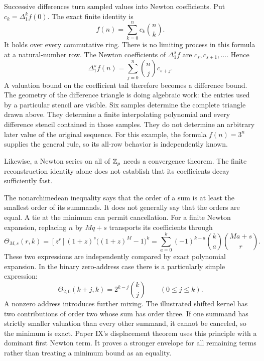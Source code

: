 Successive differences turn sampled values into Newton coefficients. Put $c_k=\Delta_1^k f(0)$. The exact finite identity is
\[
 f(n)=\sum_{k=0}^n c_k\binom nk.
\]
It holds over every commutative ring. There is no limiting process in this formula at a natural-number row.
The Newton coefficients of $\Delta_1^s f$ are $c_s,c_{s+1},\ldots$. Hence
\[
 \Delta_1^s f(n)=\sum_{j=0}^n\binom nj c_{s+j}.
\]
A valuation bound on the coefficient tail therefore becomes a difference bound. The geometry of the difference triangle is doing algebraic work: the entries used by a particular stencil are visible.
Six samples determine the complete triangle drawn above. They determine a finite interpolating polynomial and every difference stencil contained in those samples. They do not determine an arbitrary later value of the original sequence. For this example, the formula $f(n)=3^n$ supplies the general rule, so its all-row behavior is independently known.

Likewise, a Newton series on all of $\mathbb Z_p$ needs a convergence theorem. The finite reconstruction identity alone does not establish that its coefficients decay sufficiently fast.

The nonarchimedean inequality says that the order of a sum is at least the smallest order of its summands. It does not generally say that the orders are equal. A tie at the minimum can permit cancellation.
For a finite Newton expansion, replacing $n$ by $Mq+s$ transports its coefficients through
\[
 \Theta_{M,s}(r,k)
 =[z^r](1+z)^s\bigl((1+z)^M-1\bigr)^k
 =\sum_{a=0}^k(-1)^{k-a}\binom ka\binom{Ma+s}{r}.
\]
These two expressions are independently compared by exact polynomial expansion. In the binary zero-address case there is a particularly simple expression:
\[
 \Theta_{2,0}(k+j,k)=2^{k-j}\binom kj\qquad(0\le j\le k).
\]
A nonzero address introduces further mixing. The illustrated shifted kernel has two contributions of order two whose sum has order three.
If one summand has strictly smaller valuation than every other summand, it cannot be canceled, so the minimum is exact. Paper IX's displacement theorem uses this principle with a dominant first Newton term. It proves a stronger envelope for all remaining terms rather than treating a minimum bound as an equality.

